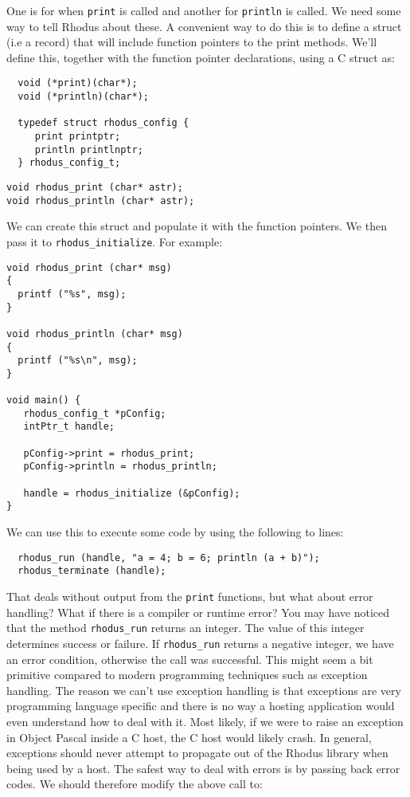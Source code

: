 One is for when {\tt print} is called and another for {\tt println} is called. We need some way to tell Rhodus about these. A convenient way to do this is to define a struct (i.e a record) that will include function pointers to the print methods. We'll define this, together with the function pointer declarations, using a C struct as:

\begin{lstlisting}
  void (*print)(char*);
  void (*println)(char*);

  typedef struct rhodus_config {
     print printptr;
     println printlnptr;
  } rhodus_config_t;
\end{lstlisting}

\begin{lstlisting}
void rhodus_print (char* astr);
void rhodus_println (char* astr);
\end{lstlisting}

We can create this struct and populate it with the function pointers. We then pass it to {\tt rhodus_initialize}. For example:

\begin{lstlisting}
void rhodus_print (char* msg)
{
  printf ("%s", msg);
}

void rhodus_println (char* msg)
{
  printf ("%s\n", msg);
}

void main() {
   rhodus_config_t *pConfig;
   intPtr_t handle;

   pConfig->print = rhodus_print;
   pConfig->println = rhodus_println;

   handle = rhodus_initialize (&pConfig);
}
\end{lstlisting}

We can use this to execute some code by using the following to lines:

\begin{lstlisting}
  rhodus_run (handle, "a = 4; b = 6; println (a + b)");
  rhodus_terminate (handle);
\end{lstlisting}

That deals without output from the {\tt print} functions, but what about error handling? What if there is a compiler or runtime error? You may have noticed that the method {\tt rhodus_run} returns an integer. The value of this integer determines success or failure. If {\tt rhodus_run} returns a negative integer, we have an error condition, otherwise the call was successful. This might seem a bit primitive compared to modern programming techniques such as exception handling.  The reason we can't use exception handling is that exceptions are very programming language specific and there is no way a hosting application would even understand how to deal with it. Most likely, if we were to raise an exception in Object Pascal inside a C host, the C host would likely crash. In general, exceptions should never attempt to propagate out of the Rhodus library when being used by a host. The safest way to deal with errors is by passing back error codes. We should therefore modify the above call to:

